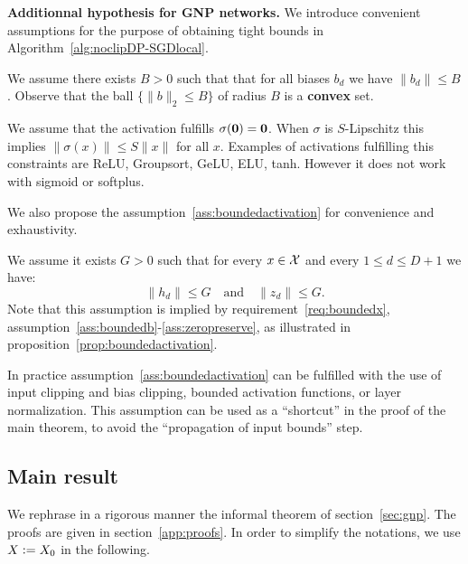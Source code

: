    \textbf{Additionnal hypothesis for GNP networks. } We introduce convenient assumptions for the purpose of obtaining tight bounds in Algorithm~\ref{alg:noclipDP-SGDlocal}.
    
    \begin{assumption}\label{ass:boundedb}
        We assume there exists $B>0$ such that that for all biases $b_d$ we have $\|b_d\|\leq B$. Observe that the ball $\{\|b\|_2\leq B\}$ of radius $B$ is a \textbf{convex} set.  
    \end{assumption}
    
    \begin{assumption}\label{ass:zeropreserve}
        We assume that the activation fulfills $\sigma(\bf 0)=\bf 0$. When $\sigma$ is $S$-Lipschitz this implies $\|\sigma(x)\|\leq S\|x\|$ for all $x$. Examples of activations fulfilling this constraints are ReLU, Groupsort, GeLU, ELU, tanh. However it does not work with sigmoid or softplus.  
    \end{assumption}
    
    We also propose the assumption~\ref{ass:boundedactivation} for convenience and exhaustivity.
    
    \begin{assumption}\label{ass:boundedactivation}
        We assume it exists $G>0$ such that for every $x\in\mathcal{X}$ and every $1\leq d\leq D+1$ we have:
        \begin{equation}
            \|h_d\|\leq G\quad\text{and}\quad\|z_d\|\leq G.
        \end{equation}
        Note that this assumption is implied by requirement~\ref{req:boundedx}, assumption~\ref{ass:boundedb}-\ref{ass:zeropreserve}, as illustrated in proposition~\ref{prop:boundedactivation}.  
    \end{assumption}

In practice assumption~\ref{ass:boundedactivation} can be fulfilled with the use of input clipping and bias clipping, bounded activation functions, or layer normalization. This assumption can be used as a ``shortcut'' in the proof of the main theorem, to avoid the ``propagation of input bounds'' step.

\subsection{Main result}\label{app:mainresult}

    We rephrase in a rigorous manner the informal theorem of section~\ref{sec:gnp}. The proofs are given in section~\ref{app:proofs}.
    In order to simplify the notations, we use $X\vcentcolon= X_0$ in the following.  

